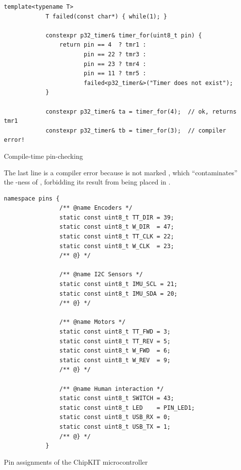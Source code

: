 \documentclass[main.tex]{subfiles}
\begin{document}
	\begin{listingfloat}[!b]
		\centering
		\begin{lstlisting}[language={[11]c++},gobble=6,frame=single]
			template<typename T>
			T failed(const char*) { while(1); }

			constexpr p32_timer& timer_for(uint8_t pin) {
				return pin == 4  ? tmr1 :
				       pin == 22 ? tmr3 :
				       pin == 23 ? tmr4 :
				       pin == 11 ? tmr5 :
				       failed<p32_timer&>("Timer does not exist");
			}

			constexpr p32_timer& ta = timer_for(4);  // ok, returns tmr1
			constexpr p32_timer& tb = timer_for(3);  // compiler error!
		\end{lstlisting}
		\caption{Compile-time pin-checking}
		\label{lst:constexpr}
		\medskip
		\small
		The last line is a compiler error because  is not marked , which \enquote{contaminates} the -ness of , forbidding its result from being placed in .
	\end{listingfloat}

	\begin{listingfloat}[!b]
		\begin{lstlisting}[language={[11]c++},gobble=6,frame=single]
			namespace pins {
				/** @name Encoders */
				static const uint8_t TT_DIR = 39;
				static const uint8_t W_DIR  = 47;
				static const uint8_t TT_CLK = 22;
				static const uint8_t W_CLK  = 23;
				/** @} */

				/** @name I2C Sensors */
				static const uint8_t IMU_SCL = 21;
				static const uint8_t IMU_SDA = 20;
				/** @} */

				/** @name Motors */
				static const uint8_t TT_FWD = 3;
				static const uint8_t TT_REV = 5;
				static const uint8_t W_FWD  = 6;
				static const uint8_t W_REV  = 9;
				/** @} */

				/** @name Human interaction */
				static const uint8_t SWITCH = 43;
				static const uint8_t LED    = PIN_LED1;
				static const uint8_t USB_RX = 0;
				static const uint8_t USB_TX = 1;
				/** @} */
			}
		\end{lstlisting}
		\caption{Pin assignments of the ChipKIT microcontroller}
		\label{lst:pins}
	\end{listingfloat}
\end{document}
